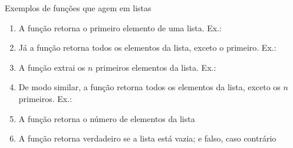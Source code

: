\begin{frame}[fragile]{Exemplos de funções que agem em listas}

    \begin{enumerate}
        \item A função  retorna o primeiro elemento de uma lista. Ex.:


        \item Já a função  retorna todos os elementos da lista, exceto o
            primeiro. Ex.:


        \item A função  extrai os $n$ primeiros elementos da lista. Ex.:


        \item De modo similar, a função  retorna todos os elementos da lista,
            exceto os $n$ primeiros. Ex.:


        \item A função  retorna o número de elementos da lista


        \item A função  retorna verdadeiro se a lista está vazia; e falso,
            caso contrário
    \end{enumerate}

\end{frame}

